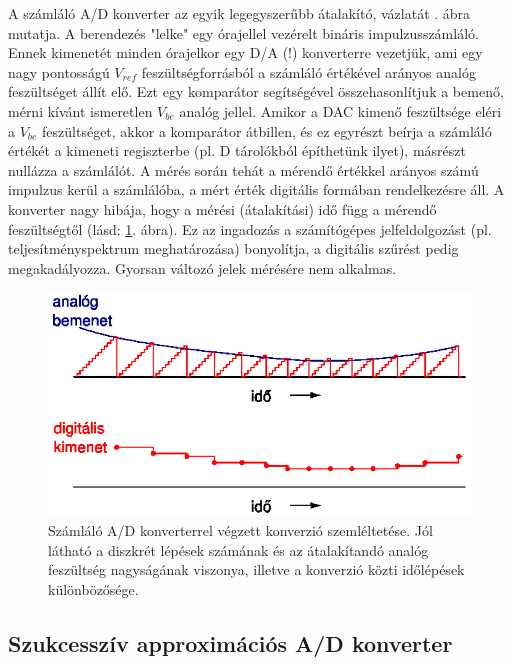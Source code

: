 \documentclass[12pt]{article}
\theoremstyle{plain}
\begin{document}
A számláló A/D konverter az egyik legegyszerűbb átalakító, vázlatát . ábra mutatja. A berendezés "lelke" egy órajellel vezérelt bináris impulzusszámláló. Ennek kimenetét minden órajelkor egy D/A (!) konverterre vezetjük, ami egy nagy pontosságú $V_{ref}$ feszültségforrásból a számláló értékével arányos analóg feszültséget állít elő. Ezt egy komparátor segítségével összehasonlítjuk a bemenő, mérni kívánt ismeretlen $V_{be}$ analóg jellel. Amikor a DAC kimenő feszültsége eléri a $V_{be}$ feszültséget, akkor a komparátor átbillen, és ez egyrészt beírja a számláló értékét a kimeneti regiszterbe (pl. D tárolókból építhetünk ilyet), másrészt nullázza a számlálót. A mérés során tehát a mérendő értékkel arányos számú impulzus kerül a számlálóba, a mért érték digitális formában rendelkezésre áll. 
A konverter nagy hibája, hogy a mérési (átalakítási) idő függ a mérendő feszültségtől (lásd: \ref{fig:adcszamlalojel}. ábra). Ez az ingadozás a számítógépes jelfeldolgozást (pl. teljesítményspektrum meghatározása) bonyolítja, a digitális szűrést pedig megakadályozza. Gyorsan változó jelek mérésére nem alkalmas.


\begin{figure}[H]
	\centering
	\includegraphics[width=0.7\linewidth]{media/ADC_szamlalo_jel}
	\caption{Számláló A/D konverterrel végzett konverzió szemléltetése. Jól látható a diszkrét lépések számának és az átalakítandó analóg feszültség nagyságának viszonya, illetve a konverzió közti időlépések különbözősége.}
	\label{fig:adcszamlalojel}
\end{figure}


\subsection{Szukcesszív approximációs A/D konverter}
\end{document}
